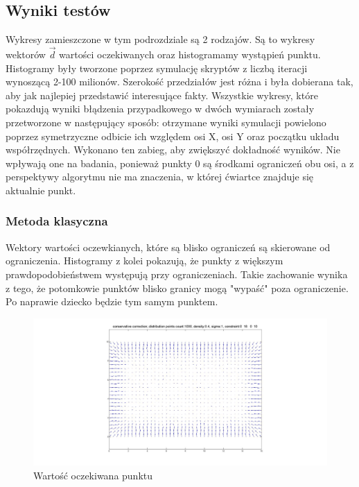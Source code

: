 \documentclass{mini}
\begin{document}
\subsection{Wyniki testów}
Wykresy zamieszczone w tym podrozdziale są 2 rodzajów. Są to wykresy wektorów $\overrightarrow{d}$ wartości oczekiwanych oraz histogramamy wystąpień punktu.\\
Histogramy były tworzone poprzez symulację skryptów z liczbą iteracji wynoszącą \mbox{2-100} milionów. Szerokość przedziałów jest różna i była dobierana tak, aby jak najlepiej przedstawić interesujące fakty. Wszystkie wykresy, które pokazdują wyniki błądzenia przypadkowego w dwóch wymiarach zostały przetworzone w następujący sposób: otrzymane wyniki symulacji powielono poprzez symetrzyczne odbicie ich względem osi X, osi Y oraz początku układu współrzędnych. Wykonano ten zabieg, aby zwiększyć dokładność wyników. Nie wpływają one na badania, ponieważ punkty 0 są środkami ograniczeń obu osi, a z perspektywy algorytmu nie ma znaczenia, w której ćwiartce znajduje się aktualnie punkt.

\subsubsection*{Metoda klasyczna}
Wektory wartości oczewkianych, które są blisko ograniczeń są skierowane od ograniczenia. Histogramy z kolei pokazują, że punkty z większym prawdopodobieństwem występują przy ograniczeniach. Takie zachowanie wynika z tego, że potomkowie punktów blisko granicy mogą "wypaść" poza ograniczenie. Po naprawie dziecko będzie tym samym punktem.

\begin{figure}[H]
\centering
\includegraphics[width=\textwidth]{conservative2dprzesuniecie}
\caption{Wartość oczekiwana punktu}
\end{figure}
\end{document}
